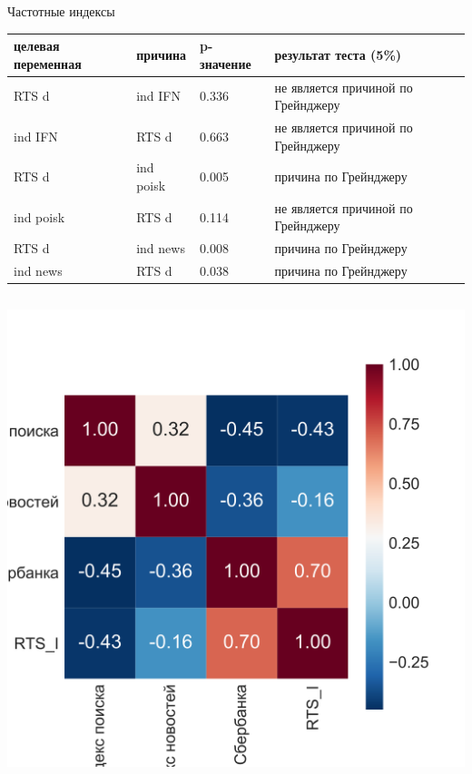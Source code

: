 \documentclass[c, dvipsnames]{beamer}  %
\begin{document}
\begin{frame}{Частотные индексы} 

	\begin{center}
			\scriptsize
	\begin{tabular}{llll}
		\toprule
		целевая переменная  &  причина &  p-значение  &   результат теста (5\%)  \\
		\midrule
		RTS d   &  ind IFN  &  0.336  & не является причиной по Грейнджеру \\ 
		ind IFN &  RTS d    &  0.663  & не является причиной по Грейнджеру \\
		RTS d   &  ind poisk& 0.005  & причина по Грейнджеру \\
		ind poisk& RTS d    & 0.114  & не является причиной по Грейнджеру \\
		RTS d   &  ind news & 0.008  & причина по Грейнджеру \\
		ind news&  RTS d    &0.038  & причина по Грейнджеру \\
		\bottomrule
	\end{tabular}

\hfill
\begin{columns}
\begin{column}{.28\linewidth}
	\includegraphics[scale=0.2]{corrindex.png}
\end{column}


\end{columns}
\end{center}
\end{frame}
\end{document}

